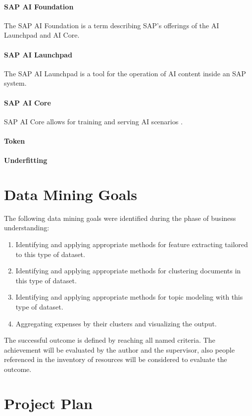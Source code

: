 	\paragraph{SAP AI Foundation} The SAP AI Foundation is a term describing SAP's offerings of the AI Launchpad and AI Core.
	\paragraph{SAP AI Launchpad} The SAP AI Launchpad is a tool for the operation of AI content inside an SAP system.
	\paragraph{SAP AI Core} SAP AI Core allows for training and serving AI scenarios \cite{schmitzLeonardo}.
	\paragraph{Token}
	\paragraph{Underfitting}


\section{Data Mining Goals}
\label{section:data-mining-goals}
The following data mining goals were identified during the phase of business understanding:

\begin{enumerate}
\item Identifying and applying appropriate methods for feature extracting tailored to this type of dataset.
\item Identifying and applying appropriate methods for clustering documents in this type of dataset.
\item Identifying and applying appropriate methods for topic modeling with this type of dataset.
\item Aggregating expenses by their clusters and visualizing the output.
\end{enumerate}

The successful outcome is defined by reaching all named criteria. The achievement will be evaluated by the author and the supervisor, also people referenced in the inventory of resources will be considered to evaluate the outcome.


\section{Project Plan}
